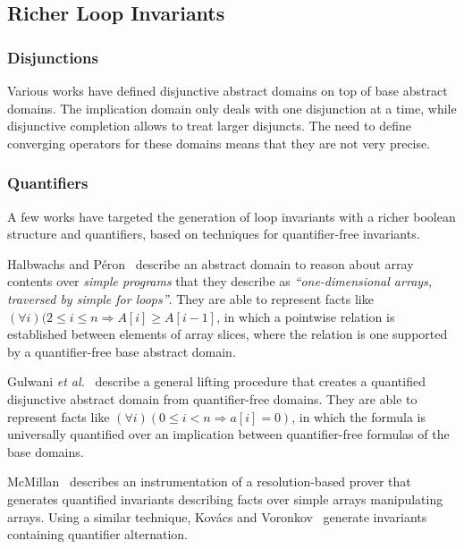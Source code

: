 \documentclass[a4paper,10pt]{article}
\newcommand{\etal}{\textit{et al.}\xspace}
\newcommand{\impl}{\ensuremath{\Longrightarrow}}
\begin{document}
\subsection{Richer Loop Invariants}

\subsubsection*{Disjunctions}

Various works have defined disjunctive abstract domains on top of base abstract
domains. The implication domain only deals with one disjunction at a time,
while disjunctive completion allows to treat larger disjuncts. The need to
define converging operators for these domains means that they are not very
precise.

\subsubsection*{Quantifiers}

A few works have targeted the generation of loop invariants with a richer
boolean structure and quantifiers, based on techniques for quantifier-free
invariants.

Halbwachs and Péron~\cite{halbwachs:2008:pldi} describe an abstract domain to
reason about array contents over \textit{simple programs} that they describe as
\textit{``one-dimensional arrays, traversed by simple for loops''}. They are
able to represent facts like $(\forall i)(2 \leq i \leq n \impl A[i] \geq
A[i−1]$, in which a pointwise relation is established between elements of array
slices, where the relation is one supported by a quantifier-free base abstract
domain.

Gulwani \etal~\cite{gulwani:2008:popl} describe a general lifting procedure
that creates a quantified disjunctive abstract domain from quantifier-free
domains. They are able to represent facts like $(\forall i)(0 \leq i < n \impl
a[i] = 0)$, in which the formula is universally quantified over an implication
between quantifier-free formulas of the base domains.

McMillan~\cite{mcmillan:2008:tacas} describes an instrumentation of a
resolution-based prover that generates quantified invariants describing facts
over simple arrays manipulating arrays. Using a similar technique, Kov\'acs and
Voronkov~\cite{kovacs:2009:fli} generate invariants containing quantifier
alternation.

\end{document}
